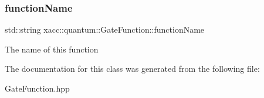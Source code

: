 \subsubsection{\texorpdfstring{function\+Name}{functionName}}
{\footnotesize\ttfamily std\+::string xacc\+::quantum\+::\+Gate\+Function\+::function\+Name\hspace{0.3cm}{\ttfamily [protected]}}

The name of this function 

The documentation for this class was generated from the following file\+:\begin{DoxyCompactItemize}
\item 
Gate\+Function.\+hpp\end{DoxyCompactItemize}
